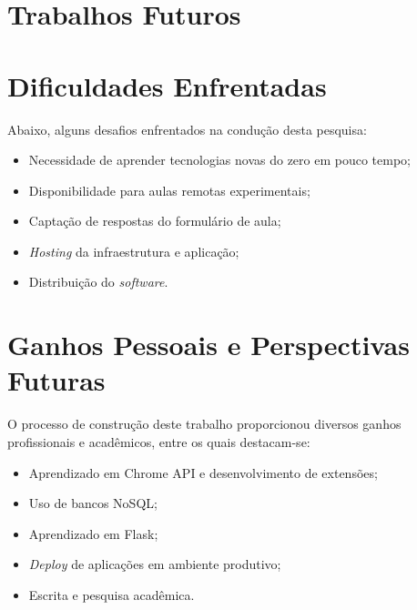 \section{Trabalhos Futuros}\label{sec:future_endeavor}



\section{Dificuldades Enfrentadas}\label{sec:hardships}
Abaixo, alguns desafios enfrentados na condução desta pesquisa:

\begin{itemize}
    \item Necessidade de aprender tecnologias novas do zero em pouco tempo;
    \item Disponibilidade para aulas remotas experimentais;
    \item Captação de respostas do formulário de aula;
    \item \textit{Hosting} da infraestrutura e aplicação;
    \item Distribuição do \textit{software}.
\end{itemize}


\section{Ganhos Pessoais e Perspectivas Futuras}\label{sec:personal_gains}

O processo de construção deste trabalho proporcionou diversos ganhos profissionais e acadêmicos, entre os quais destacam-se:

\begin{itemize}
    \item Aprendizado em Chrome API e desenvolvimento de extensões;
    \item Uso de bancos NoSQL;
    \item Aprendizado em Flask;
    \item \textit{Deploy} de aplicações em ambiente produtivo;
    \item Escrita e pesquisa acadêmica.
\end{itemize}
